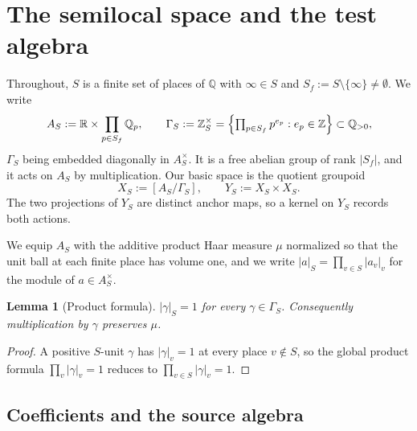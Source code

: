 \documentclass[11pt]{amsart}
\newtheorem{lemma}[theorem]{Lemma}
\theoremstyle{definition}
\theoremstyle{remark}
\newcommand{\R}{\mathbb R}
\newcommand{\Z}{\mathbb Z}
\newcommand{\Q}{\mathbb Q}
\begin{document}
\section{The semilocal space and the test algebra}\label{sec:carrier}

Throughout, $S$ is a finite set of places of $\Q$ with $\infty\in S$ and
$S_f:=S\setminus\{\infty\}\ne\emptyset$.  We write
\[
A_S:=\R\times\prod_{p\in S_f}\Q_p,\qquad
\Gamma_S:=\Z_S^{\times}=\Bigl\{\textstyle\prod_{p\in S_f}p^{e_p}: e_p\in\Z\Bigr\}
\subset\Q_{>0},
\]
$\Gamma_S$ being embedded diagonally in $A_S^{\times}$.  It is a free abelian
group of rank $|S_f|$, and it acts on $A_S$ by multiplication.  Our basic
space is the quotient groupoid
\begin{equation}\label{eq:carrier}
X_S:=[A_S/\Gamma_S],\qquad Y_S:=X_S\times X_S .
\end{equation}
The two projections of $Y_S$ are distinct anchor maps, so a kernel on $Y_S$
records both actions.

We equip $A_S$ with the additive product Haar measure $\mu$ normalized so that
the unit ball at each finite place has volume one, and we write
$|a|_S=\prod_{v\in S}|a_v|_v$ for the module of $a\in A_S^{\times}$.

\begin{lemma}[Product formula]\label{lem:prodformula}
$|\gamma|_S=1$ for every $\gamma\in\Gamma_S$.  Consequently multiplication by
$\gamma$ preserves $\mu$.
\end{lemma}

\begin{proof}
A positive $S$-unit $\gamma$ has $|\gamma|_v=1$ at every place $v\notin S$, so
the global product formula $\prod_{v}|\gamma|_v=1$ reduces to
$\prod_{v\in S}|\gamma|_v=1$.
\end{proof}

\subsection{Coefficients and the source algebra}
\end{document}
